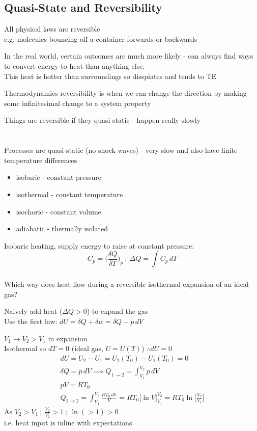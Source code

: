 \documentclass[a4paper, 11pt, normalem]{report}
\begin{document}
\section{Quasi-State and Reversibility}
All physical laws are reversible \\
e.g. molecules bouncing off a container forwards or backwards

In the real world, certain outcomes are much more likely - can always find ways to convert energy to heat than anything else. \\
This heat is hotter than surroundings so disspiates and tends to TE

Thermodynamics reversibility is when we can change the direction by making some infinitesimal change to a system property

Things are reversible if they quasi-static - happen really slowly

\chapter{}
Processes are quasi-static (no shock waves) - very slow and also have finite temperature differences
\begin{itemize}
    \item[] isobaric - constant pressure
    \item[] isothermal - constant temperature
    \item[] isochoric - constant volume
    \item[] adiabatic - thermally isolated
\end{itemize}
Isobaric heating, supply energy to raise at constant pressure:
\begin{equation*}
    C_p = \Big(\frac{\delta Q}{\delta T}\Big)_p ~;~ \Delta Q = \int C_p \, dT
\end{equation*}

\subsection{}
Which way does heat flow during a reversible isothermal expansion of an ideal gas?

Naively add heat ($\Delta Q > 0$) to expand the gas \\
Use the first law: $dU = \delta Q + \delta w = \delta Q - p\,dV$

$V_1 \to V_2 > V_1$ in expansion \\
Isothermal so $dT = 0$ (ideal gas, $U = U(T)$) $\therefore dU = 0$
\begin{gather*}
    dU = U_2 - U_1 = U_{2}(T_{0}) - U_{1}(T_{0}) = 0 \\
    \delta Q = p\,dV \implies Q_{1\to2} = \int_{V_{1}}^{V_{2}} p\,dV \\
    pV = RT_0 \\
    Q_{1\to2} = \int_{V_{1}}^{V_{2}} \frac{RT_{0}\,dV}{V} = RT_{0}\Big[\ln V \Big]_{V_{1}}^{V_{2}} = RT_{0}\ln\bigg[\frac{V_{2}}{V_1}\bigg]
\end{gather*}
As $V_2 > V_1 ~;~ \frac{V_2}{V_1} > 1 ~;~ \ln(> 1) > 0$ \\
i.e. heat input is inline with expectations
\end{document}
